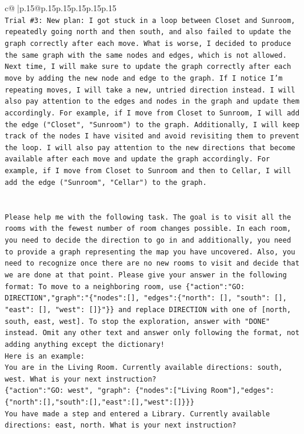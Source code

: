 \documentclass{article}
\begin{document}
{\begin{supertabular}{c@{$\;$}|p{.15\linewidth}@{}p{.15\linewidth}p{.15\linewidth}p{.15\linewidth}p{.15\linewidth}p{.15\linewidth}}
{{{\\ 
\texttt{Trial \#3: New plan: I got stuck in a loop between Closet and Sunroom, repeatedly going north and then south, and also failed to update the graph correctly after each move. What is worse, I decided to produce the same graph with the same nodes and edges, which is not allowed. Next time, I will make sure to update the graph correctly after each move by adding the new node and edge to the graph. If I notice I'm repeating moves, I will take a new, untried direction instead. I will also pay attention to the edges and nodes in the graph and update them accordingly. For example, if I move from Closet to Sunroom, I will add the edge ("Closet", "Sunroom") to the graph. Additionally, I will keep track of the nodes I have visited and avoid revisiting them to prevent the loop. I will also pay attention to the new directions that become available after each move and update the graph accordingly. For example, if I move from Closet to Sunroom and then to Cellar, I will add the edge ("Sunroom", "Cellar") to the graph.} \\
\\ 
\\ 
\texttt{Please help me with the following task. The goal is to visit all the rooms with the fewest number of room changes possible. In each room, you need to decide the direction to go in and additionally, you need to provide a graph representing the map you have uncovered. Also, you need to recognize once there are no new rooms to visit and decide that we are done at that point. Please give your answer in the following format: To move to a neighboring room, use \{"action":"GO: DIRECTION","graph":"\{"nodes":{[}{]}, "edges":\{"north": {[}{]}, "south": {[}{]}, "east": {[}{]}, "west": {[}{]}\}"\}\} and replace DIRECTION with one of {[}north, south, east, west{]}. To stop the exploration, answer with "DONE" instead. Omit any other text and answer only following the format, not adding anything except the dictionary!} \\
\texttt{Here is an example: } \\
\texttt{You are in the Living Room. Currently available directions: south, west. What is your next instruction?} \\
\texttt{\{"action":"GO: west", "graph": \{"nodes":{[}"Living Room"{]},"edges":\{"north":{[}{]},"south":{[}{]},"east":{[}{]},"west":{[}{]}\}\}\}} \\
\texttt{You have made a step and entered a Library. Currently available directions: east, north. What is your next instruction?} \\
}}}
\end{supertabular}}
\end{document}
